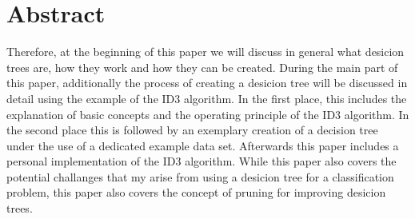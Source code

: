 \chapter{Abstract}
\label{abstract}

Therefore, at the beginning of this paper we will discuss in general what desicion trees are, how they work and how they can be created. During the main part of this paper, additionally the process of creating a desicion tree will be discussed in detail using the example of the ID3 algorithm. In the first place, this includes the explanation of basic concepts and the operating principle of the ID3 algorithm. In the second place this is followed by an exemplary creation of a decision tree under the use of a dedicated example data set. Afterwards this paper includes a personal implementation of the ID3 algorithm. While this paper also covers the potential challanges that my arise from using a desicion tree for a classification problem, this paper also covers the concept of pruning for improving desicion trees.
